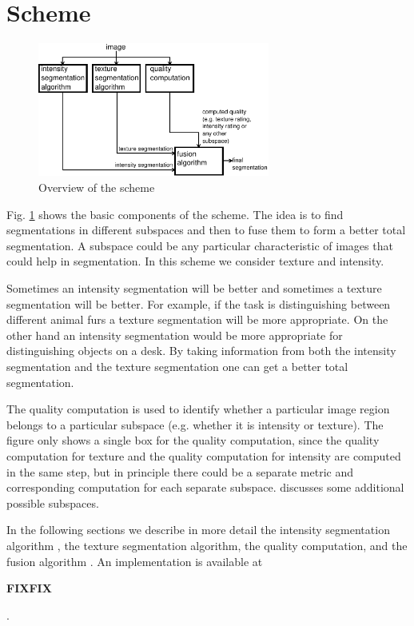 \documentclass[twocolumn]{article}
\begin{document}
\section{Scheme}


\begin{figure}[!t]
\centering
\includegraphics[width=3in]{overview}
\caption{Overview of the scheme}
\label{fig:overview}
\end{figure}


Fig. \ref{fig:overview} shows the basic components of the scheme. The
idea is to find segmentations in different subspaces and then to fuse
them to form a better total segmentation. A subspace could be any
particular characteristic of images that could help in
segmentation. In this scheme we consider texture and intensity. 


Sometimes an intensity segmentation will be better and sometimes
a texture segmentation will be better. For example, if the 
task is distinguishing between different animal furs a texture
segmentation will be more appropriate. On the other hand an intensity
segmentation would be more appropriate for distinguishing objects on a
desk. By taking information from both the intensity
segmentation and the texture segmentation one can get a
better total segmentation.

The quality computation is used to identify whether a particular image
region belongs to a particular subspace (e.g. whether it is intensity
or texture). The figure only shows a single box for the quality
computation, since the quality computation for texture and the quality
computation for intensity are computed in the same step, but in
principle there could be a separate metric and corresponding
computation for each separate subspace. \cite{prev} discusses some
additional possible subspaces. 

In the following sections we describe in more detail the
intensity segmentation algorithm \cite{intensity}, the texture
segmentation algorithm, the quality computation, and the
fusion algorithm \cite{fusion1}. An implementation is available at \begin{Large}\textbf{FIXFIX}\end{Large}. 
\end{document}
